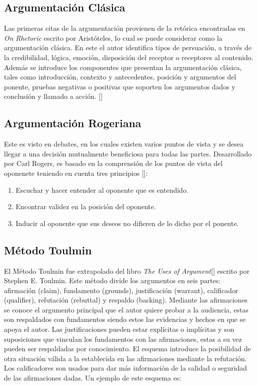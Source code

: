 \subsection{Argumentación Clásica}

Las primeras citas de la argumentación provienen de la retórica encontradas en \emph{On Rhetoric} 
escrito por Aristóteles, lo cual se puede considerar como la argumentación clásica. 
En este el autor identifica tipos de persuación, a través de la credibilidad, lógica, 
emoción, disposición del receptor o receptores al contenido.
Además se introduce los componentes que presentan la argumentación clásica, tales como
introducción, contexto y antecedentes, posición y argumentos del ponente, pruebas negativas o positivas
que soporten los argumentos dados y conclusión y llamado a acción. [\cite{classicalArgument}] 

\subsection{Argumentación Rogeriana}

Este es visto en debates, en los cuales existen varios puntos de vista y se desea llegar a una 
decisión mutualmente beneficiosa para todas las partes. Desarrollado por Carl Rogers, es basado en 
la comprensión de los puntos de vista del oponenete teniendo en cuenta tres principios 
[\cite{rogerianArgument}]:

\begin{enumerate}
    \item Escuchar y hacer entender al oponente que es entendido.
    \item Encontrar validez en la posición del oponente.
    \item Inducir al oponente que sus deseos no difieren de lo dicho por el ponente.
\end{enumerate}

\subsection{Método Toulmin}

El Método Toulmin fue extrapolado del libro \emph{The Uses of Argument}[\cite{toulmin_2003}] escrito por Stephen E. Toulmin.
Este método divide los argumentos en seis partes: afirmación (claim), fundamento (grounds), 
justificación (warrant), calificador (qualifier), refutación (rebuttal) y respaldo (backing).
Mediante las afirmaciones se conoce el argumento principal que el autor quiere probar a la audiencia,
estas son respaldados con fundamentos siendo estos las evidencias y hechos en que se apoya el autor.
Las justificaciones pueden estar explícitas o implícitas y son suposiciones que vinculan los
fundamentos con las afirmaciones, estas a su vez pueden ser respaldadas por conocimiento.
El esquema introduce la posibilidad de otra situación válida a la establecida en las afirmaciones
mediante la refutación. Los calificadores son usados para dar más información de la calidad o seguridad
de las afirmaciones dadas. Un ejemplo de este esquema es:

